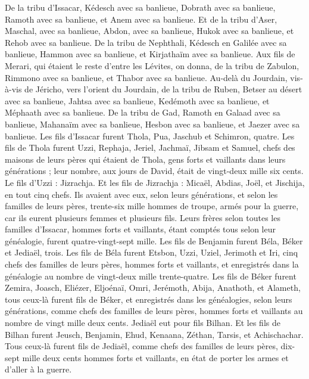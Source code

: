 \begin{multicols}{2}
De la tribu d'Issacar, Kédesch avec sa banlieue, Dobrath avec sa banlieue,
Ramoth avec sa banlieue, et Anem avec sa banlieue.
Et de la tribu d'Aser, Maschal, avec sa banlieue, Abdon, avec sa banlieue,
Hukok avec sa banlieue, et Rehob avec sa banlieue.
De la tribu de Nephthali, Kédesch en Galilée avec sa banlieue, Hammon avec sa banlieue, et Kirjathaïm avec sa banlieue.
Aux fils de Merari, qui étaient le reste d'entre les Lévites, on donna, de la tribu de Zabulon, Rimmono avec sa banlieue, et Thabor avec sa banlieue.
Au-delà du Jourdain, vis-à-vis de Jéricho, vers l’orient du Jourdain, de la tribu de Ruben, Betser au désert avec sa banlieue, Jahtsa avec sa banlieue,
Kedémoth avec sa banlieue, et Méphaath avec sa banlieue.
De la tribu de Gad, Ramoth en Galaad avec sa banlieue, Mahanaïm avec sa banlieue,
Hesbon avec sa banlieue, et Jaezer avec sa banlieue.
\VerseOne{}Les fils d'Issacar furent  Thola, Pua, Jaschub et Schimron, quatre.
Les fils de Thola furent Uzzi, Rephaja, Jeriel, Jachmaï, Jibsam et Samuel, chefs des maisons de leurs pères qui étaient de Thola, gens forts et vaillants dans leurs générations ; leur nombre, aux jours de David, était de vingt-deux mille six cents.
Le fils d’Uzzi : Jizrachja. Et les fils de Jizrachja : Micaël, Abdias, Joël, et Jischija, en tout cinq chefs.
Ils avaient avec eux, selon leurs générations, et selon les familles de leurs pères, trente-six mille hommes de troupe, armés pour la guerre, car ils eurent plusieurs femmes et plusieurs fils.
Leurs frères selon toutes les familles d'Issacar, hommes forts et vaillants, étant comptés tous selon leur généalogie, furent quatre-vingt-sept mille.
Les fils de Benjamin furent Béla, Béker et Jediaël, trois.
Les fils de Béla furent  Etsbon, Uzzi, Uziel, Jerimoth et Iri, cinq chefs des familles de leurs pères, hommes forts et vaillants, et enregistrés dans la généalogie au nombre de vingt-deux mille trente-quatre.
Les fils de Béker furent  Zemira, Joasch, Eliézer, Eljoénaï, Omri, Jerémoth, Abija, Anathoth, et Alameth, tous ceux-là furent fils de Béker,
et enregistrés dans les généalogies, selon leurs générations, comme chefs des familles de leurs pères, hommes forts et vaillants au nombre de vingt mille deux cents.
Jediaël eut pour fils Bilhan. Et les fils de Bilhan furent Jeusch, Benjamin, Ehud, Kenaana, Zéthan, Tarsis, et Achischachar.
Tous ceux-là furent fils de Jediaël, comme chefs des familles de leurs pères, dix-sept mille deux cents hommes forts et vaillants, en état de porter les armes et d’aller à la guerre.

\end{multicols}
